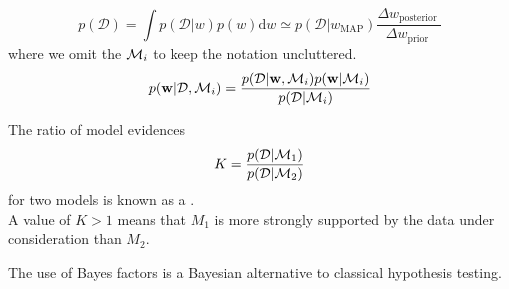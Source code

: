 \documentclass[11pt]{article}
\numberwithin{equation}{section}
\begin{document}
\begin{equation}
	p(\mathcal{D})=\int p(\mathcal{D} | w) p(w) \mathrm{d} w \simeq p\left(\mathcal{D} | w_{\mathrm{MAP}}\right) \frac{\Delta w_{\text {posterior }}}{\Delta w_{\text {prior }}}
\end{equation}
where we omit the $\mathcal{M}_i$ to keep the notation uncluttered.
\begin{equation}
	p(\textbf{w}|\mathcal{D},\mathcal{M}_i) = \frac{p(\mathcal{D}|\textbf{w}, \mathcal{M}_i)p(\textbf{w}|\mathcal{M}_i)}{p(\mathcal{D}|\mathcal{M}_i)}
\end{equation}

The ratio of model evidences 
\begin{equation}
	K = \frac{p(\mathcal{D}|\mathcal{M}_1)}{p(\mathcal{D}|\mathcal{M}_2)}
\end{equation}
for two models is known as a .\\
A value of $K > 1$ means that $M_1$ is more strongly supported by the data under consideration than $M_2$.

\remark
The use of Bayes factors is a Bayesian alternative to classical hypothesis testing.
\end{document}
